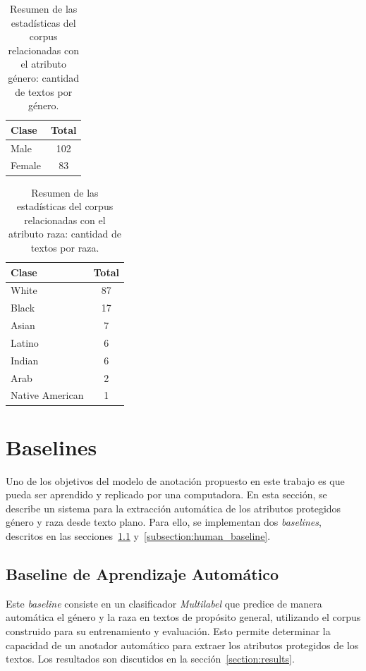 \begin{table}[htpb]
    \centering
        \begin{tabular}{lc}
        \toprule
          \textbf{Clase} & \textbf{Total} \\
        \midrule
                    Male & 102 \\
                  Female & 83 \\

        \bottomrule
        \end{tabular}
    \caption{Resumen de las estad\'isticas del corpus relacionadas con el atributo g\'enero: cantidad de textos por g\'enero.}
    \label{table:stats_gen}
\end{table}

\begin{table}[htpb]
    \centering
        \begin{tabular}{lc}
        \toprule
            \textbf{Clase} & \textbf{Total} \\
        \midrule
                     White & 87 \\
                     Black & 17 \\
                     Asian & 7 \\
                    Latino & 6 \\
                    Indian & 6 \\
                      Arab & 2 \\
           Native American & 1 \\

        \bottomrule
        \end{tabular}
    \caption{Resumen de las estad\'isticas del corpus relacionadas con el atributo raza: cantidad de textos por raza.}
    \label{table:stats_race}
\end{table}

\section{Baselines}\label{section:baseline}
Uno de los objetivos del modelo de anotaci\'on propuesto en este trabajo es que pueda ser aprendido 
y replicado por una computadora. En esta secci\'on, se describe un sistema para la extracci\'on
autom\'atica de los atributos protegidos g\'enero y raza desde texto plano. Para ello, se 
implementan dos \emph{baselines}, descritos en las secciones~\ref{subsection:ml_baseline} 
y~\ref{subsection:human_baseline}.

\subsection{Baseline de Aprendizaje Autom\'atico}\label{subsection:ml_baseline}
Este \emph{baseline} consiste en un clasificador \emph{Multilabel}  que predice 
de manera autom\'atica el g\'enero y la raza en textos de prop\'osito general, utilizando el corpus construido 
para su entrenamiento y evaluaci\'on. Esto permite determinar la capacidad de un anotador autom\'atico para 
extraer los atributos protegidos de los textos. Los resultados son discutidos en la secci\'on~\ref{section:results}.


